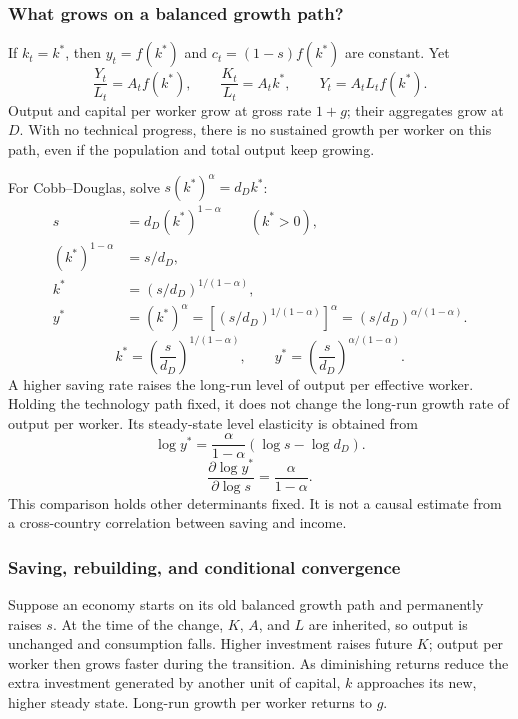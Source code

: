 \subsubsection{What grows on a balanced growth path?}

If $k_t=k^*$, then $y_t=f(k^*)$ and $c_t=(1-s)f(k^*)$ are constant. Yet
\begin{equation}\label{eq:solow-bgp}
\frac{Y_t}{L_t}=A_tf(k^*),\qquad
\frac{K_t}{L_t}=A_tk^*,\qquad
Y_t=A_tL_tf(k^*).
\end{equation}
Output and capital per worker grow at gross rate $1+g$; their aggregates grow
at $D$. With no technical progress, there is no sustained growth per worker on
this path, even if the population and total output keep growing.

For Cobb--Douglas, solve $s(k^*)^\alpha=d_Dk^*$:
\begin{align}
s&=d_D(k^*)^{1-\alpha}\qquad(k^*>0),\\
(k^*)^{1-\alpha}&=s/d_D,\\
k^*&=(s/d_D)^{1/(1-\alpha)},\\
y^*&=(k^*)^\alpha
     =[(s/d_D)^{1/(1-\alpha)}]^\alpha
     =(s/d_D)^{\alpha/(1-\alpha)}.
\end{align}
\begin{equation}\label{eq:solow-cd-steady}
k^*=\left(\frac{s}{d_D}\right)^{1/(1-\alpha)},\qquad
y^*=\left(\frac{s}{d_D}\right)^{\alpha/(1-\alpha)}.
\end{equation}
A higher saving rate raises the long-run level of output per effective worker.
Holding the technology path fixed, it does not change the long-run growth rate
of output per worker. Its steady-state level elasticity is
obtained from
\[
\log y^*=\frac{\alpha}{1-\alpha}(\log s-\log d_D).
\]
\begin{equation}
\frac{\partial\log y^*}{\partial\log s}=\frac{\alpha}{1-\alpha}.
\end{equation}
This comparison holds other determinants fixed. It is not a causal estimate
from a cross-country correlation between saving and income.

\subsubsection{Saving, rebuilding, and conditional convergence}

Suppose an economy starts on its old balanced growth path and permanently
raises $s$. At the time of the change, $K$, $A$, and $L$ are inherited, so output
is unchanged and consumption falls. Higher investment raises future $K$; output
per worker then grows faster during the transition. As diminishing returns
reduce the extra investment generated by another unit of capital, $k$ approaches
its new, higher steady state. Long-run growth per worker returns to $g$.

